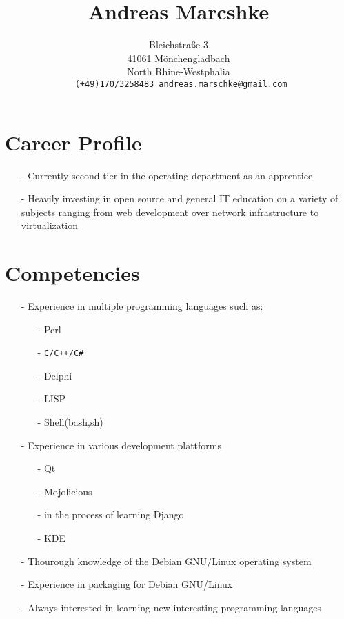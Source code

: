 \documentclass[11pt]{article}
\title{Andreas Marcshke}
\author{Bleichstraße 3 \\ 41061 Mönchengladbach \\ North Rhine-Westphalia
  \\ \texttt{ (+49)170/3258483 andreas.marschke@gmail.com}}
\date{}
\begin{document}
\maketitle

\section*{Career Profile}

\begin{itemize}
  \item[-] Currently second tier in the operating department as an apprentice
  \item[-] Heavily investing in open source and general IT education
    on a variety of subjects ranging from web development over network
    infrastructure to virtualization
\end{itemize}

\section*{Competencies}

\begin{itemize}
  \item[-] Experience in multiple programming languages such as:
    \begin{itemize}
      \item[-] Perl
      \item[-] \verb*|C/C++/C#|
      \item[-] Delphi
      \item[-] LISP
      \item[-] Shell(bash,sh)
    \end{itemize}

  \item[-] Experience in various development plattforms
    \begin{itemize}
      \item[-] Qt
      \item[-] Mojolicious
      \item[-] in the process of learning Django
      \item[-] KDE
    \end{itemize}
  \item[-] Thourough knowledge of the Debian GNU/Linux operating
    system
  \item[-] Experience in packaging for Debian GNU/Linux
  \item[-] Always interested in learning new interesting programming
    languages
\end{itemize}
\thispagestyle{empty}
\pagebreak
\end{document}
